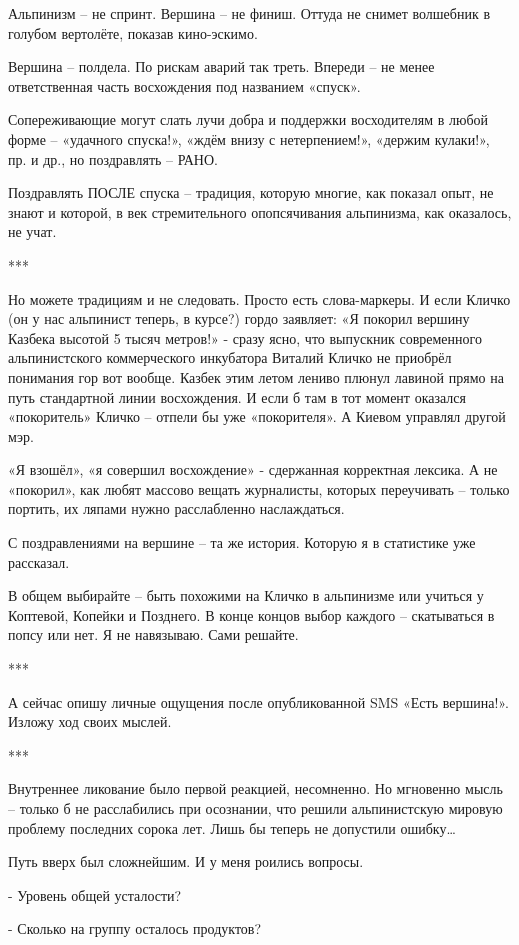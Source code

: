 Альпинизм – не спринт. Вершина – не финиш. Оттуда не снимет волшебник в голубом
вертолёте, показав кино-эскимо.

Вершина – полдела. По рискам аварий так треть. Впереди – не менее ответственная
часть восхождения под названием «спуск».

Сопереживающие могут слать лучи добра и поддержки восходителям в любой форме –
«удачного спуска!», «ждём внизу с нетерпением!», «держим кулаки!», пр. и др.,
но поздравлять – РАНО.

Поздравлять ПОСЛЕ спуска – традиция, которую многие, как показал опыт, не знают
и которой, в век стремительного опопсячивания альпинизма, как оказалось, не
учат.

***

Но можете традициям и не следовать. Просто есть слова-маркеры. И если Кличко
(он у нас альпинист теперь, в курсе?) гордо заявляет: «Я покорил вершину
Казбека высотой 5 тысяч метров!» - сразу ясно, что выпускник современного
альпинистского коммерческого инкубатора Виталий Кличко не приобрёл понимания
гор вот вообще. Казбек этим летом лениво плюнул лавиной прямо на путь
стандартной линии восхождения. И если б там в тот момент оказался «покоритель»
Кличко – отпели бы уже «покорителя». А Киевом управлял другой мэр.

«Я взошёл», «я совершил восхождение» - сдержанная корректная лексика. А не
«покорил», как любят массово вещать журналисты, которых переучивать – только
портить, их ляпами  нужно расслабленно наслаждаться.

С поздравлениями на вершине – та же история. Которую я в статистике уже
рассказал. 

В общем выбирайте – быть похожими на Кличко в альпинизме или учиться у
Коптевой, Копейки и Позднего. В конце концов выбор каждого – скатываться в
попсу или нет. Я не навязываю. Сами решайте.

***

А сейчас опишу личные ощущения после опубликованной SMS «Есть вершина!». Изложу
ход своих мыслей.

***

Внутреннее ликование было первой реакцией, несомненно. Но мгновенно мысль –
только б не расслабились при осознании, что решили альпинистскую мировую
проблему последних сорока лет. Лишь бы теперь не допустили ошибку…

Путь вверх был сложнейшим. И у меня роились вопросы.

- Уровень общей усталости?

- Сколько на группу осталось продуктов?


